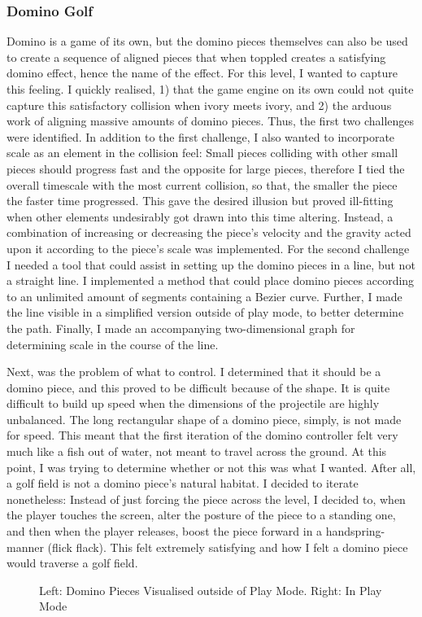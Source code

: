 \subsubsection{Domino Golf}
Domino is a game of its own, but the domino pieces themselves can also be used to create a sequence of aligned pieces that when toppled creates a satisfying domino effect, hence the name of the effect. For this level, I wanted to capture this feeling. I quickly realised, 1) that the game engine on its own could not quite capture this satisfactory collision when ivory meets ivory, and 2) the arduous work of aligning massive amounts of domino pieces. Thus, the first two challenges were identified. In addition to the first challenge, I also wanted to incorporate scale as an element in the collision feel: Small pieces colliding with other small pieces should progress fast and the opposite for large pieces, therefore I tied the overall timescale with the most current collision, so that, the smaller the piece the faster time progressed. This gave the desired illusion but proved ill-fitting when other elements undesirably got drawn into this time altering. Instead, a combination of increasing or decreasing the piece's velocity and the gravity acted upon it according to the piece's scale was implemented. For the second challenge I needed a tool that could assist in setting up the domino pieces in a line, but not a straight line. I implemented a method that could place domino pieces according to an unlimited amount of segments containing a Bezier curve. Further, I made the line visible in a simplified version outside of play mode, to better determine the path. Finally, I made an accompanying two-dimensional graph for determining scale in the course of the line.

Next, was the problem of what to control. I determined that it should be a domino piece, and this proved to be difficult because of the shape. It is quite difficult to build up speed when the dimensions of the projectile are highly unbalanced. The long rectangular shape of a domino piece, simply, is not made for speed. This meant that the first iteration of the domino controller felt very much like a fish out of water, not meant to travel across the ground. At this point, I was trying to determine whether or not this was what I wanted. After all, a golf field is not a domino piece's natural habitat. I decided to iterate nonetheless: Instead of just forcing the piece across the level, I decided to, when the player touches the screen, alter the posture of the piece to a standing one, and then when the player releases, boost the piece forward in a handspring-manner (flick flack). This felt extremely satisfying and how I felt a domino piece would traverse a golf field.
\begin{center}
  \begin{figure}[!htb]
    \noindent{}
    \caption{Left: Domino Pieces Visualised outside of Play Mode. Right: In Play Mode}
    \label{Domino}
  \end{figure}
\end{center}
